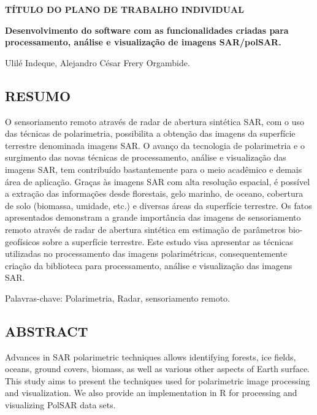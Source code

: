\documentclass[a4paper,12pt]{article}
\begin{document}
\newpage
\begin{center}
    \textbf{TÍTULO DO PLANO DE TRABALHO INDIVIDUAL}

    \textbf{Desenvolvimento do software com as funcionalidades
    criadas para processamento, análise e visualização de imagens SAR/polSAR.}
\end{center}

Ulilé Indeque, Alejandro César Frery Orgambide.


\begin{center}
    \section*{RESUMO}
    \justifying
    O sensoriamento remoto através de radar de abertura sintética SAR, com o uso das técnicas de polarimetria, possibilita a obtenção das imagens da superfície terrestre denominada imagens SAR.
    O avanço da tecnologia de polarimetria e o surgimento das novas técnicas de processamento, análise e visualização das imagens SAR, tem contribuído bastantemente para o meio acadêmico e demais área de aplicação.
    Graças às imagens SAR com alta resolução espacial, é possível a extração das informações desde florestais, gelo marinho, de oceano, cobertura de solo (biomassa, umidade, etc.) e diversas áreas da superfície terrestre.
    Os fatos apresentados demonstram a grande importância das imagens de sensoriamento remoto através de radar de abertura sintética em estimação de parâmetros bio-geofísicos sobre a superfície terrestre. Este estudo visa apresentar as técnicas utilizadas no processamento das imagens polarimétricas, consequentemente criação da biblioteca para processamento, análise e visualização das imagens SAR.\newline
\end{center}

Palavras-chave: Polarimetria, Radar, sensoriamento remoto.\newline

\begin{center}
    \section*{ABSTRACT}
    \justifying
    Advances in SAR polarimetric techniques allows identifying forests, ice fields, oceans, ground covers, biomass, as well as various other aspects of Earth surface. This study aims to present the techniques used for polarimetric image processing and visualization. We also provide an implementation in R for processing and visualizing PolSAR data sets.
\end{center}
\end{document}
